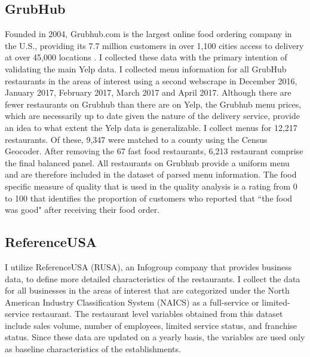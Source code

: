 \documentclass[11pt]{article}
\begin{document}
\subsection{GrubHub} 

Founded in 2004, Grubhub.com is the largest online food ordering company in the U.S., providing its 7.7 million customers in over 1,100 cities access to delivery at over 45,000 locations \cite{grubstat}. I collected these data with the primary intention of validating the main Yelp data. I collected menu information for all GrubHub restaurants in the areas of interest using a second webscrape in December 2016, January 2017, February 2017, March 2017 and April 2017. Although there are fewer restaurants on Grubhub than there are on Yelp, the Grubhub menu prices, which are necessarily up to date given the nature of the delivery service, provide an idea to what extent the Yelp data is generalizable. I collect menus for 12,217 restaurants. Of these, 9,347 were matched to a county using the Census Geocoder. After removing the 67 fast food restaurants, 6,213 restaurant comprise the final balanced panel. All restaurants on Grubhub provide a uniform menu and are therefore included in the dataset of parsed menu information. The food specific measure of quality that is used in the quality analysis is a rating from 0 to 100 that identifies the proportion of customers who reported that ``the food was good" after receiving their food order.



\subsection{ReferenceUSA}

I utilize ReferenceUSA (RUSA), an Infogroup company that provides business data, to define more detailed characteristics of the restaurants. I collect the data for all businesses in the areas of interest that are categorized under the North American Industry Classification System (NAICS) as a full-service or limited-service restaurant. The restaurant level variables obtained from this dataset include sales volume, number of employees, limited service status, and franchise status. Since these data are updated on a yearly basis, the variables are used only as baseline characteristics of the establishments. 
\end{document}
